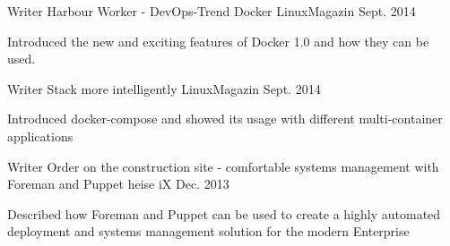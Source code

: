 \begin{cventries}
  \cventry
    {Writer} %
    {Harbour Worker - DevOps-Trend Docker} %
    {LinuxMagazin} %
    {Sept. 2014} %
    {
      \begin{cvitems} %
        \item {Introduced the new and exciting features of Docker 1.0 and how they can be used.}
      \end{cvitems}
    }
  \cventry
    {Writer} %
    {Stack more intelligently} %
    {LinuxMagazin} %
    {Sept. 2014} %
    {
      \begin{cvitems} %
        \item {Introduced docker-compose and showed its usage with different multi-container applications}
      \end{cvitems}
    }
  \cventry
    {Writer} %
    {Order on the construction site - comfortable systems management with Foreman and Puppet} %
    {heise iX} %
    {Dec. 2013} %
    {
      \begin{cvitems} %
        \item {Described how Foreman and Puppet can be used to create a highly automated deployment and systems management solution for the modern Enterprise}
      \end{cvitems}
    }

\end{cventries}

